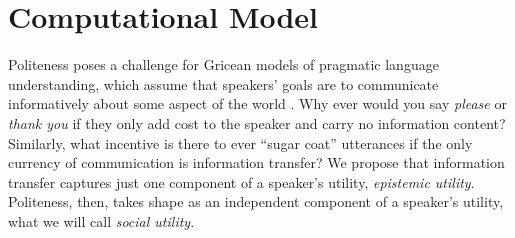 \documentclass[10pt,letterpaper]{article}
\newcommand{\ndg}[1]{\textcolor{Green}{[ndg: #1]}}
\begin{document}


\section{Computational Model}

Politeness poses a challenge for Gricean models of pragmatic language understanding, which assume that speakers' goals are to communicate informatively about some aspect of the world \cite{Frank2012, Goodman2013}. 
Why ever would you say \emph{please} or \emph{thank you} if they only add cost to the speaker and carry no information content?
Similarly, what incentive is there to ever ``sugar coat'' utterances if the only currency of communication is information transfer? 
We propose that information transfer captures just one component of a speaker's utility, \emph{epistemic utility}.
Politeness, then, takes shape as an independent component of a speaker's utility, what we will call \emph{social utility}. 
\end{document}

